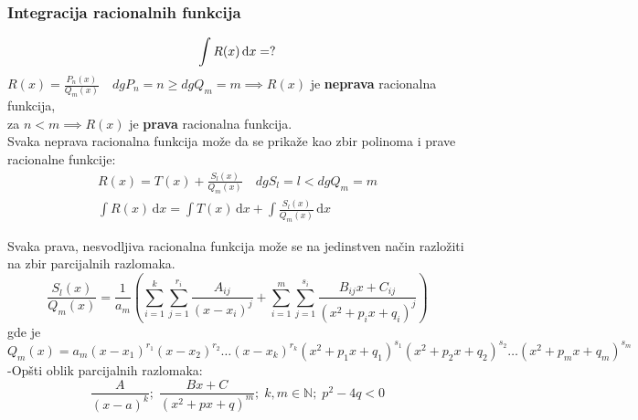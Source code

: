 \subsubsection{Integracija racionalnih funkcija}
	$$\int R(x)\, \mathrm{d}x = ?\\$$
	$R(x) = \frac{P_n (x)}{Q_m (x)}\quad dg P_n = n \geq dg Q_m = m \implies R(x)$ je \textbf{neprava} racionalna funkcija,\\
	za $n<m \implies R(x)$ je \textbf{prava} racionalna funkcija.\\
	Svaka neprava racionalna funkcija može da se prikaže kao zbir polinoma i prave racionalne funkcije:
	\begin{gather*}
		R(x) = T(x)+\frac{S_l(x)}{Q_m(x)}\quad dg S_l = l < dg Q_m = m\\
		\int R(x)\, \mathrm{d}x = \int T(x)\, \mathrm{d}x + \int \frac{S_l(x)}{Q_m(x)} \, \mathrm{d}x
	\end{gather*}
	\begin{theorem}
		Svaka prava, nesvodljiva racionalna funkcija može se na jedinstven način razložiti na zbir parcijalnih razlomaka.
		$$\frac{S_l(x)}{Q_m(x)} = \frac{1}{a_m}\left( \sum^k_{i=1} \sum^{r_i}_{j=1} \frac{A_{ij}}{(x-x_i)^j}+\sum^m_{i=1} \sum^{s_i}_{j=1} \frac{B_{ij}x+C_{ij}}{(x^2+p_ix+q_i)^j}\right)$$
		gde je $Q_m (x)=a_m(x-x_1)^{r_1}(x-x_2)^{r_2}\ldots(x-x_k)^{r_k}(x^2+p_1x+q_1)^{s_1}(x^2+p_2x+q_2)^{s_2} \ldots (x^2+p_mx+q_m)^{s_m}$
		-Opšti oblik parcijalnih razlomaka:
		$$\frac{A}{(x-a)^k};\; \frac{Bx+C}{(x^2+px+q)^m};\; k,m \in \mathbb{N};\; p^2-4q<0$$
	\end{theorem}
	
